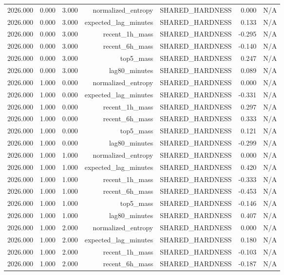\begin{table}[h!]
\begin{tabular}{lrrrrrr}
2026.000 & 0.000 & 3.000 & normalized\_entropy & SHARED\_HARDNESS & 0.000 & N/A \\
2026.000 & 0.000 & 3.000 & expected\_lag\_minutes & SHARED\_HARDNESS & 0.133 & N/A \\
2026.000 & 0.000 & 3.000 & recent\_1h\_mass & SHARED\_HARDNESS & -0.295 & N/A \\
2026.000 & 0.000 & 3.000 & recent\_6h\_mass & SHARED\_HARDNESS & -0.140 & N/A \\
2026.000 & 0.000 & 3.000 & top5\_mass & SHARED\_HARDNESS & 0.247 & N/A \\
2026.000 & 0.000 & 3.000 & lag80\_minutes & SHARED\_HARDNESS & 0.089 & N/A \\
2026.000 & 1.000 & 0.000 & normalized\_entropy & SHARED\_HARDNESS & 0.000 & N/A \\
2026.000 & 1.000 & 0.000 & expected\_lag\_minutes & SHARED\_HARDNESS & -0.331 & N/A \\
2026.000 & 1.000 & 0.000 & recent\_1h\_mass & SHARED\_HARDNESS & 0.297 & N/A \\
2026.000 & 1.000 & 0.000 & recent\_6h\_mass & SHARED\_HARDNESS & 0.333 & N/A \\
2026.000 & 1.000 & 0.000 & top5\_mass & SHARED\_HARDNESS & 0.121 & N/A \\
2026.000 & 1.000 & 0.000 & lag80\_minutes & SHARED\_HARDNESS & -0.299 & N/A \\
2026.000 & 1.000 & 1.000 & normalized\_entropy & SHARED\_HARDNESS & 0.000 & N/A \\
2026.000 & 1.000 & 1.000 & expected\_lag\_minutes & SHARED\_HARDNESS & 0.420 & N/A \\
2026.000 & 1.000 & 1.000 & recent\_1h\_mass & SHARED\_HARDNESS & -0.333 & N/A \\
2026.000 & 1.000 & 1.000 & recent\_6h\_mass & SHARED\_HARDNESS & -0.453 & N/A \\
2026.000 & 1.000 & 1.000 & top5\_mass & SHARED\_HARDNESS & -0.146 & N/A \\
2026.000 & 1.000 & 1.000 & lag80\_minutes & SHARED\_HARDNESS & 0.407 & N/A \\
2026.000 & 1.000 & 2.000 & normalized\_entropy & SHARED\_HARDNESS & 0.000 & N/A \\
2026.000 & 1.000 & 2.000 & expected\_lag\_minutes & SHARED\_HARDNESS & 0.180 & N/A \\
2026.000 & 1.000 & 2.000 & recent\_1h\_mass & SHARED\_HARDNESS & -0.103 & N/A \\
2026.000 & 1.000 & 2.000 & recent\_6h\_mass & SHARED\_HARDNESS & -0.187 & N/A \\

\end{tabular}
\end{table}
